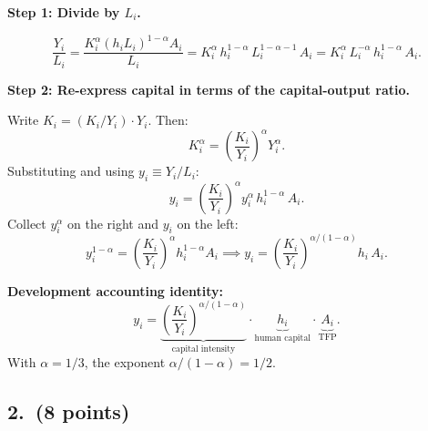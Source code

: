 \documentclass[a4paper,11pt]{article}
\begin{document}
\begin{answerbox}
\textbf{Step 1: Divide by $L_i$.}

\[
    \frac{Y_i}{L_i} = \frac{K_i^{\alpha}(h_i L_i)^{1-\alpha} A_i}{L_i}
    = K_i^{\alpha}\,h_i^{1-\alpha}\,L_i^{1-\alpha-1}\,A_i
    = K_i^{\alpha}\,L_i^{-\alpha}\,h_i^{1-\alpha}\,A_i.
\]

\textbf{Step 2: Re-express capital in terms of the capital-output ratio.}

Write $K_i = (K_i/Y_i)\cdot Y_i$. Then:
\[
    K_i^{\alpha} = \left(\frac{K_i}{Y_i}\right)^{\!\alpha} Y_i^{\alpha}.
\]
Substituting and using $y_i \equiv Y_i/L_i$:
\[
    y_i = \left(\frac{K_i}{Y_i}\right)^{\!\alpha} y_i^{\alpha}\,h_i^{1-\alpha}\,A_i.
\]
Collect $y_i^{\alpha}$ on the right and $y_i$ on the left:
\[
    y_i^{1-\alpha} = \left(\frac{K_i}{Y_i}\right)^{\!\alpha} h_i^{1-\alpha} A_i
    \implies
    y_i = \left(\frac{K_i}{Y_i}\right)^{\!\alpha/(1-\alpha)} h_i\,A_i.
\]

\textbf{Development accounting identity:}
\[
    \boxed{y_i = \underbrace{\left(\frac{K_i}{Y_i}\right)^{\!\alpha/(1-\alpha)}}_{\text{capital intensity}}
    \cdot\underbrace{h_i}_{\text{human capital}}
    \cdot\underbrace{A_i}_{\text{TFP}}.}
\]
With $\alpha = 1/3$, the exponent $\alpha/(1-\alpha) = 1/2$.
\end{answerbox}

\subsection*{2.\ (8 points)}
\end{document}
